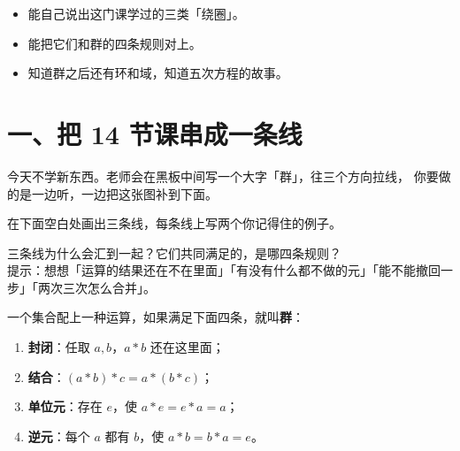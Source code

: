 

\begin{mubiao}
  \begin{itemize}
    \item 能自己说出这门课学过的三类「绕圈」。
    \item 能把它们和群的四条规则对上。
    \item 知道群之后还有环和域，知道五次方程的故事。
  \end{itemize}
\end{mubiao}

\section*{一、把 14 节课串成一条线}

\noindent 今天不学新东西。老师会在黑板中间写一个大字「群」，往三个方向拉线，
你要做的是一边听，一边把这张图补到下面。

\begin{dongshou}[画出主线图]
  在下面空白处画出三条线，每条线上写两个你记得住的例子。

\end{dongshou}

\begin{sikao}
  三条线为什么会汇到一起？它们共同满足的，是哪四条规则？\\
  提示：想想「运算的结果还在不在里面」「有没有什么都不做的元」「能不能撤回一步」「两次三次怎么合并」。
\end{sikao}

\begin{definition}[群]
  一个集合配上一种运算，如果满足下面四条，就叫\textbf{群}：
  \begin{enumerate}
    \item \textbf{封闭}：任取 \(a,b\)，\(a*b\) 还在这里面；
    \item \textbf{结合}：\((a*b)*c=a*(b*c)\)；
    \item \textbf{单位元}：存在 \(e\)，使 \(a*e=e*a=a\)；
    \item \textbf{逆元}：每个 \(a\) 都有 \(b\)，使 \(a*b=b*a=e\)。
  \end{enumerate}
\end{definition}

